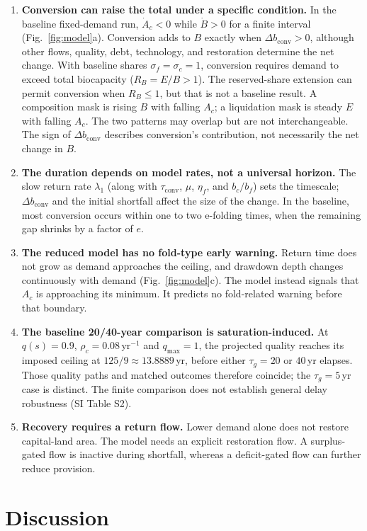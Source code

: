 \documentclass[preprint,12pt,authoryear]{elsarticle}
\newcommand{\dconv}{\Delta b_{\mathrm{conv}}}
\newcommand{\tconv}{\tau_{\mathrm{conv}}}
\begin{document}
\begin{enumerate}[label=P\arabic*.,leftmargin=2.2em]
\item \textbf{Conversion can raise the total under a specific condition.} In the baseline fixed-demand run, $\dot A_c<0$ while $\dot B>0$ for a finite interval (Fig.~\ref{fig:model}a). Conversion adds to $B$ exactly when $\dconv>0$, although other flows, quality, debt, technology, and restoration determine the net change. With baseline shares $\sigma_f=\sigma_c=1$, conversion requires demand to exceed total biocapacity ($R_B=E/B>1$). The reserved-share extension can permit conversion when $R_B\le1$, but that is not a baseline result. A composition mask is rising $B$ with falling $A_c$; a liquidation mask is steady $E$ with falling $A_c$. The two patterns may overlap but are not interchangeable. The sign of $\dconv$ describes conversion's contribution, not necessarily the net change in $B$.
\item \textbf{The duration depends on model rates, not a universal horizon.} The slow return rate $\lambda_1$ (along with $\tconv$, $\mu$, $\eta_f$, and $b_c/b_f$) sets the timescale; $\dconv$ and the initial shortfall affect the size of the change. In the baseline, most conversion occurs within one to two e-folding times, when the remaining gap shrinks by a factor of $e$.
\item \textbf{The reduced model has no fold-type early warning.} Return time does not grow as demand approaches the ceiling, and drawdown depth changes continuously with demand (Fig.~\ref{fig:model}c). The model instead signals that $A_c$ is approaching its minimum. It predicts no fold-related warning before that boundary.
\item \textbf{The baseline 20/40-year comparison is saturation-induced.} At $q(s)=0.9$, $\rho_c=0.08$\,yr$^{-1}$ and $q_{\max}=1$, the projected quality reaches its imposed ceiling at $125/9\approx13.8889$\,yr, before either $\tau_g=20$ or $40$\,yr elapses. Those quality paths and matched outcomes therefore coincide; the $\tau_g=5$\,yr case is distinct. The finite comparison does not establish general delay robustness (SI Table S2).
\item \textbf{Recovery requires a return flow.} Lower demand alone does not restore capital-land area. The model needs an explicit restoration flow. A surplus-gated flow is inactive during shortfall, whereas a deficit-gated flow can further reduce provision.
\end{enumerate}
\clearpage
\section{Discussion}\label{sec:discussion}
\end{document}
